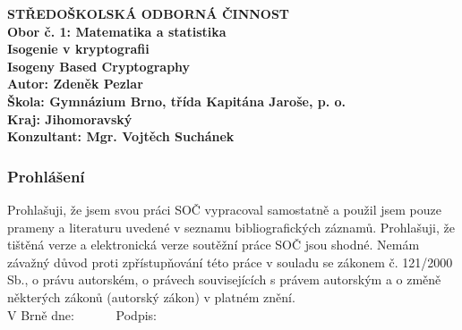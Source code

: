 \documentclass [12pt]{report}
\begin{document}
\begin{titlepage}
{
\centering
\LARGE \textbf{STŘEDOŠKOLSKÁ ODBORNÁ ČINNOST}\\
\Large\textbf{Obor č. 1: Matematika a statistika}\\
\vspace{6cm}
\LARGE\textbf{Isogenie v kryptografii}\\
\vspace{1cm}
\LARGE\textbf{Isogeny Based Cryptography}\\
}
\vspace{6cm}
{\noindent\large\bfseries Autor: Zdeněk Pezlar\\ 
	\large\bfseries Škola: Gymnázium Brno, třída Kapitána Jaroše, p. o.\\
    \large\bfseries Kraj: Jihomoravský \\
	\large\bfseries Konzultant: Mgr. Vojtěch Suchánek\\}

\end{titlepage}

\newpage
\thispagestyle{empty}
\vspace*{14cm}
\subsubsection*{Prohlášení}

Prohlašuji, že jsem svou práci SOČ vypracoval samostatně a použil jsem pouze prameny a literaturu uvedené v seznamu bibliografických záznamů.
Prohlašuji, že tištěná verze a elektronická verze soutěžní práce SOČ jsou shodné. 
Nemám závažný důvod proti zpřístupňování této práce v souladu se zákonem č. 121/2000 Sb., o právu autorském, o právech souvisejících s právem autorským a o změně některých zákonů (autorský zákon) v platném znění. \\[1cm]
V Brně dne: \dotfill \ \ \ \ \ \  Podpis: \dotfill
\end{document}
